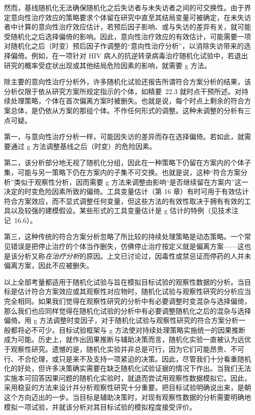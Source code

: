 然而，基线随机化无法确保随机化之后失访者与未失访者之间的可交换性。由于界定意向性治疗效应的策略要求个体留在研究中直至其结局变量可被确定，在未失访者中计算的意向性治疗效应估计，若预后因子影响、或与失访的差异有关，就可能受随机化之后选择偏倚的影响。因此，意向性治疗效应的有效估计，可能需要一项对随机化之后（时变）预后因子作调整的“意向性治疗分析”，以消除失访带来的选择偏倚。例如，在一项针对 HIV 病人的抗逆转录病毒治疗随机化试验中，若退出研究的概率受症状出现或其他结局危险因素的影响，就需要 g 方法。

除主要的意向性治疗分析外，许多随机化试验还报告所谓符合方案分析的结果，该分析仅限于依从研究方案所规定指示的个体，如精要~22.3 就时点干预所述。对持续处理策略，个体在首次偏离方案时被删失。也就是说，每个时点上剩余的符合方案总体，是仍依从方案的那组个体。不作任何形式的调整。这种未调整的分析有三点可疑。

第一，与意向性治疗分析一样，可能因失访的差异而存在选择偏倚。若如此，就需要通过 g 方法调整基线之后（时变）的危险因素。

第二，该分析部分地无视了随机化分组，因此在一种策略下仍留在方案内的个体子集，可能与另一策略下仍在方案内的子集不可交换。也就是说，这种“符合方案分析”类似于观察性分析，因而需要 g 方法来调整由影响“是否继续留在方案内”这一决定的时变危险因素所致的偏倚。工具变量估计（第 16 章）有时可用于有效估计符合方案效应，而不显式调整任何变量，但这些方法的有效性取决于拥有有效的工具以及较强的建模假设。某些形式的工具变量估计是 g 估计的特例（见技术注记~16.6）。

第三，这种传统的符合方案分析忽略了所比较的持续处理策略是动态策略。一个常见错误是把停止治疗的个体当作删失，仿佛停止治疗按定义就是偏离方案——这也是该分析又称\emph{在治疗分析}的原因。上文已讨论过，因毒性或禁忌证而停药的人并未偏离方案，因此不应被删失。

以上全部考量都适用于随机化试验与旨在模拟目标试验的观察性数据的分析。当目标是估计符合方案效应或其观察性对应物时，随机化试验与观察性研究的分析应当完全相同。如果我们觉得在观察性研究的分析中有必要调整时变混杂与选择偏倚，那么我们也应同样觉得在随机化试验的分析中有必要调整随机化之后的混杂与选择偏倚。用 g 方法调整时变因子，对于随机化试验与观察性研究的符合方案分析一般都将必不可少。目标试验框架与 g 方法使对持续处理策略实施统一的因果推断成为可能。历史上，就作出因果推断与辅助决策而言，随机化实验一直被认为远优于观察性研究。遗憾的是，随机化实验并非总是可行，因为它们可能昂贵、不可行、不合伦理，或只是来不及支持一项紧迫的决策。因此，尽管我们十分看重随机化的好处，但许多决策确实需要在缺乏随机化试验证据的情况下作出。当我们无法实施本可回答因果问题的随机化实验时，就退而尝试用观察性数据模拟它。因此，采用稳妥的方法来设计并分析观察性研究十分重要。把目标试验明确说出来，是朝这个方向迈出的一步。当目标是辅助决策时，对现有观察性数据的分析需要明确地模拟一项试验，并就该分析对其目标试验的模拟程度接受评价。

